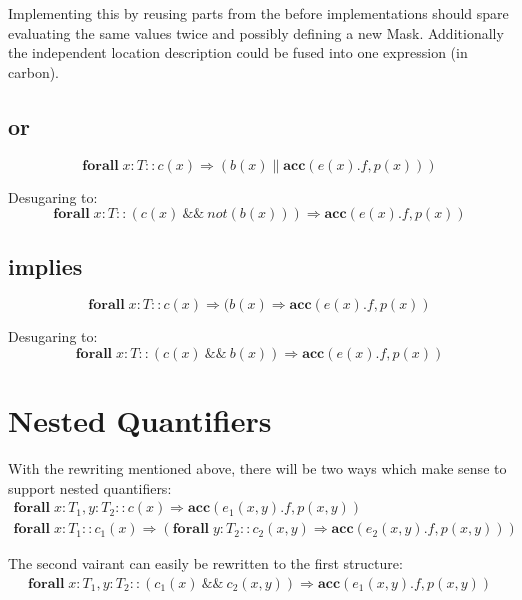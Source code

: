\documentclass[12pt]{article}
\begin{document}
Implementing this by reusing parts from the before implementations should spare evaluating the same values twice and possibly defining a new Mask. Additionally the independent location description could be fused into one expression (in carbon).
\subsection{or}
\begin{equation}
	\mathbf{forall} \; x:T :: c(x) \Rightarrow (b(x) \| \mathbf{acc}(e(x).f, p(x) ))
\end{equation}

Desugaring to:
\begin{equation}
	\mathbf{forall} \; x:T :: (c(x) \:\&\&\: not(b(x))) \Rightarrow  \mathbf{acc}(e(x).f, p(x))
\end{equation}

\subsection{implies}
\begin{equation}
	\mathbf{forall} \; x:T :: c(x) \Rightarrow (b(x) \Rightarrow \mathbf{acc}(e(x).f, p(x))
\end{equation}

Desugaring to:
\begin{equation}
	\mathbf{forall} \; x:T ::( c(x) \:\&\&\: b(x)) \Rightarrow \mathbf{acc}(e(x).f, p(x))
\end{equation}
\section{Nested Quantifiers}
With the rewriting mentioned above, there will be two ways which make sense to support nested quantifiers:
\begin{equation}
\begin{aligned}
	\mathbf{forall} \; x:T_1, y:T_2 :: c(x) \Rightarrow \mathbf{acc}(e_1(x, y).f, p(x, y))\\
	\mathbf{forall} \; x:T_1 :: c_1(x) \Rightarrow (\mathbf{forall} \; y:T_2 :: c_2(x, y) \Rightarrow \mathbf{acc}(e_2(x, y).f, p(x,y)))
\end{aligned}
\end{equation}

The second vairant can easily be rewritten to the first structure:
\begin{equation}
\begin{aligned}
	\mathbf{forall} \; x:T_1, y:T_2 :: (c_1(x)  \:\&\&\: c_2(x, y)) \Rightarrow \mathbf{acc}(e_1(x, y).f, p(x, y))\\
\end{aligned}
\end{equation}
\end{document}
